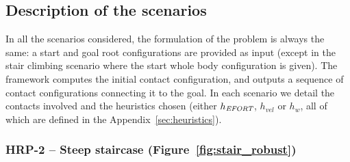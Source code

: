 \subsection{Description of the scenarios}
In all the scenarios considered, the formulation of the problem is always the same:
a start and goal root configurations are provided as input (except in the stair climbing scenario where the start whole body configuration is given).
The framework computes the initial contact configuration, and outputs a sequence of contact configurations connecting it to the goal.
In each scenario we detail the contacts involved and the heuristics chosen (either $h_{\textrm{\it EFORT}}$, $h_{vel}$ or $h_{w}$, all of which are defined in the Appendix~\ref{sec:heuristics}).

\subsubsection{HRP-2 -- Steep staircase (Figure~\ref{fig:stair_robust})}

